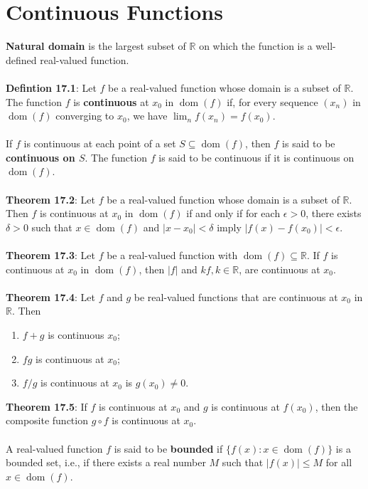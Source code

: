 \documentclass{article}
\theoremstyle{definition}
\DeclareMathOperator{\Dom}{dom}
\begin{document}
\section*{Continuous Functions}
\textbf{Natural domain} is the largest subset of $\mathbb{R}$ on which the function is a well-defined real-valued function. \\ \\
\textbf{Defintion 17.1}: Let $f$ be a real-valued function whose domain is a subset of $\mathbb{R}$. The function $f$ is \textbf{continuous} at $x_0$ in $\Dom(f)$ if, for every sequence $(x_n)$ in $\Dom(f)$ converging to $x_0$, we have $\lim_n f(x_n) = f(x_0)$. \\ \\
If $f$ is continuous at each point of a set $S \subseteq \Dom(f)$, then $f$ is said to be \textbf{continuous on $S$}. The function $f$ is said to be continuous if it is continuous on $\Dom(f)$. \\ \\
\textbf{Theorem 17.2}: Let $f$ be a real-valued function whose domain is a subset of $\mathbb{R}$. Then $f$ is continuous at $x_0$ in $\Dom(f)$ if and only if for each $\epsilon > 0$, there exists $\delta > 0$ such that $x \in \Dom(f)$ and $|x - x_0| < \delta$ imply $|f(x) - f(x_0)| < \epsilon$. \\ \\
\textbf{Theorem 17.3}: Let $f$ be a real-valued function with $\Dom(f) \subseteq \mathbb{R}$. If $f$ is continuous at $x_0$ in $\Dom(f)$, then $|f|$ and $kf, k \in \mathbb{R}$, are continuous at $x_0$. \\ \\
\textbf{Theorem 17.4}: Let $f$ and $g$ be real-valued functions that are continuous at $x_0$ in $\mathbb{R}$. Then \begin{enumerate}
    \item $f + g$ is continuous $x_0$;
    \item $fg$ is continuous at $x_0$;
    \item $f/g$ is continuous at $x_0$ is $g(x_0) \neq 0$.
\end{enumerate} $ $ \\
\textbf{Theorem 17.5}: If $f$ is continuous at $x_0$ and $g$ is continuous at $f(x_0)$, then the composite function $g \circ f$ is continuous at $x_0$. \\ \\
A real-valued function $f$ is said to be \textbf{bounded} if $\{f(x) : x \in \Dom(f)\}$ is a bounded set, i.e., if there exists a real number $M$ such that $|f(x)| \leq M$ for all $x \in \Dom(f)$. \\ \\
\end{document}
